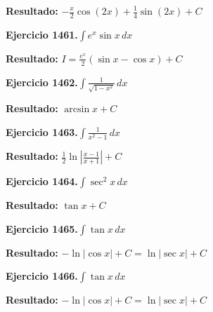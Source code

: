 \documentclass[10pt,a4paper]{article}
\begin{document}
\begin{solbox}
\textbf{Resultado:} \(\displaystyle -\frac{x}{2}\cos(2x) + \frac{1}{4}\sin(2x) + C\)
\end{solbox}

\begin{ejbox}
\textbf{Ejercicio 1461.}\quad $\int e^x\sin x\,dx$
\end{ejbox}

\begin{solbox}
\textbf{Resultado:} \(\displaystyle I = \frac{e^x}{2}(\sin x - \cos x) + C\)
\end{solbox}

\newpage
\begin{ejbox}
\textbf{Ejercicio 1462.}\quad $\int \frac{1}{\sqrt{1-x^2}}\,dx$
\end{ejbox}

\begin{solbox}
\textbf{Resultado:} \(\displaystyle \arcsin x + C\)
\end{solbox}

\begin{ejbox}
\textbf{Ejercicio 1463.}\quad $\int \frac{1}{x^2-1}\,dx$
\end{ejbox}

\begin{solbox}
\textbf{Resultado:} \(\displaystyle \frac{1}{2}\ln\left|\frac{x-1}{x+1}\right| + C\)
\end{solbox}

\begin{ejbox}
\textbf{Ejercicio 1464.}\quad $\int \sec^2 x\,dx$
\end{ejbox}

\begin{solbox}
\textbf{Resultado:} \(\displaystyle \tan x + C\)
\end{solbox}

\newpage
\begin{ejbox}
\textbf{Ejercicio 1465.}\quad $\int \tan x\,dx$
\end{ejbox}

\begin{solbox}
\textbf{Resultado:} \(\displaystyle -\ln|\cos x| + C = \ln|\sec x| + C\)
\end{solbox}

\begin{ejbox}
\textbf{Ejercicio 1466.}\quad $\int \tan x\,dx$
\end{ejbox}

\begin{solbox}
\textbf{Resultado:} \(\displaystyle -\ln|\cos x| + C = \ln|\sec x| + C\)
\end{solbox}
\end{document}
